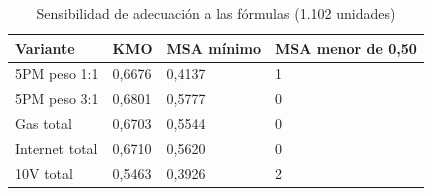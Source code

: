 \begin{table}[htbp]
\centering\small
\caption{Sensibilidad de adecuación a las fórmulas (1.102 unidades)}\label{tab:kmo_sensibilidad}
\begin{tabular}{@{}p{}p{}p{}p{}@{}}
\toprule
Variante & KMO & MSA mínimo & MSA menor de 0,50 \\
\midrule
5PM peso 1:1 & 0,6676 & 0,4137 & 1 \\
5PM peso 3:1 & 0,6801 & 0,5777 & 0 \\
Gas total & 0,6703 & 0,5544 & 0 \\
Internet total & 0,6710 & 0,5620 & 0 \\
10V total & 0,5463 & 0,3926 & 2 \\
\bottomrule
\end{tabular}
\end{table}
